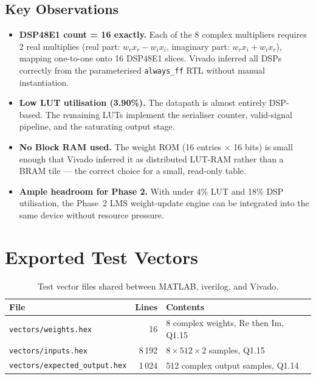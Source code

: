 \documentclass[11pt,a4paper]{article}
\begin{document}
\subsection{Key Observations}

\begin{itemize}
    \item \textbf{DSP48E1 count = 16 exactly.} Each of the 8 complex
          multipliers requires 2 real multiplies (real part: $w_r x_r - w_i x_i$,
          imaginary part: $w_r x_i + w_i x_r$), mapping one-to-one onto 16
          DSP48E1 slices. Vivado inferred all DSPs correctly from the
          parameterised \texttt{always\_ff} RTL without manual instantiation.

    \item \textbf{Low LUT utilisation (3.90\%).} The datapath is almost
          entirely DSP-based. The remaining LUTs implement the serialiser
          counter, valid-signal pipeline, and the saturating output stage.

    \item \textbf{No Block RAM used.} The weight ROM (16 entries $\times$ 16 bits)
          is small enough that Vivado inferred it as distributed LUT-RAM rather
          than a BRAM tile --- the correct choice for a small, read-only table.

    \item \textbf{Ample headroom for Phase 2.} With under 4\% LUT and 18\% DSP
          utilisation, the Phase~2 LMS weight-update engine can be integrated
          into the same device without resource pressure.
\end{itemize}

\section{Exported Test Vectors}

\begin{table}[H]
\centering
\begin{tabular}{lrl}
\toprule
\textbf{File} & \textbf{Lines} & \textbf{Contents} \\
\midrule
\texttt{vectors/weights.hex}          & 16     & 8 complex weights, Re then Im, Q1.15 \\
\texttt{vectors/inputs.hex}           & 8\,192 & $8 \times 512 \times 2$ samples, Q1.15 \\
\texttt{vectors/expected\_output.hex} & 1\,024 & 512 complex output samples, Q1.14 \\
\bottomrule
\end{tabular}
\caption{Test vector files shared between MATLAB, iverilog, and Vivado.}
\end{table}
\end{document}
